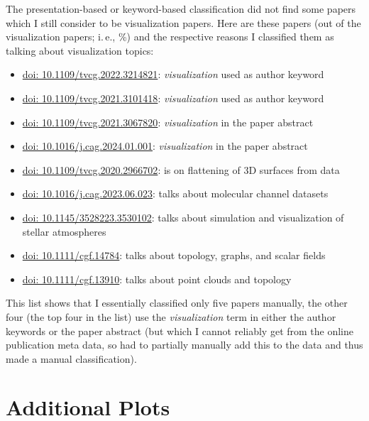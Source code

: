 \documentclass[conference,svgnames]{vgtc}                     %
\newcommand*{\percentageRounded}[2]{%
	\pgfmathparse{#1*100/#2}%
	\pgfmathprintnumber[fixed, precision=1]{\pgfmathresult}%
}
\newcommand{\ie}{i.\,e.}
\begin{document}
The presentation-based or keyword-based classification did not find some papers which I still consider to be visualization papers. Here are these \GrsiVisManuallyMarkedPapersCount{} papers (out of the \GrsiTotalVisPapers{} visualization papers; \ie, \percentageRounded{\GrsiVisManuallyMarkedPapersCount}{\GrsiTotalVisPapers}\%) and the respective reasons I classified them as talking about visualization topics:
\begin{itemize}[parsep=0pt]
\item \href{https://doi.org/10.1109/tvcg.2022.3214821}{doi: 10.1109/tvcg.2022.3214821}: \emph{visualization} used as author keyword
\item \href{https://doi.org/10.1109/tvcg.2021.3101418}{doi: 10.1109/tvcg.2021.3101418}: \emph{visualization} used as author keyword
\item \href{https://doi.org/10.1109/tvcg.2021.3067820}{doi: 10.1109/tvcg.2021.3067820}: \emph{visualization} in the paper abstract
\item \href{https://doi.org/10.1016/j.cag.2024.01.001}{doi: 10.1016/j.cag.2024.01.001}: \emph{visualization} in the paper abstract
\item \href{https://doi.org/10.1109/tvcg.2020.2966702}{doi: 10.1109/tvcg.2020.2966702}: is on flattening of 3D surfaces from data
\item \href{https://doi.org/10.1016/j.cag.2023.06.023}{doi: 10.1016/j.cag.2023.06.023}: talks about molecular channel datasets
\item \href{https://doi.org/10.1145/3528223.3530102}{doi: 10.1145/3528223.3530102}: talks about simulation and visualization of stellar atmospheres
\item \href{https://doi.org/10.1111/cgf.14784}{doi: 10.1111/cgf.14784}: talks about topology, graphs, and scalar fields
\item \href{https://doi.org/10.1111/cgf.13910}{doi: 10.1111/cgf.13910}: talks about point clouds and topology
\end{itemize}
This list shows that I essentially classified only five papers manually, the other four (the top four in the list) use the \emph{visualization} term in either the author keywords or the paper abstract (but which I cannot reliably get from the online publication meta data, so had to partially manually add this to the data and thus made a manual classification).

\section{Additional Plots}
\label{app:plots}
\end{document}
